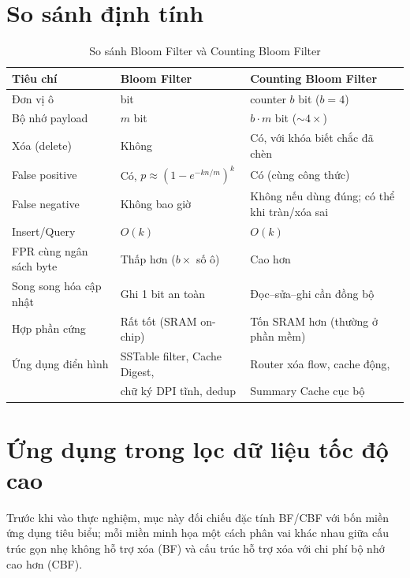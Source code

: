 \documentclass[11pt,a4paper]{article}
\begin{document}
\section{So sánh định tính}
\begin{table}[H]\centering
\caption{So sánh Bloom Filter và Counting Bloom Filter}
\label{tab:qualitative}
\small
\begin{tabular}{@{}
  >{\raggedright\arraybackslash}p{}
  >{\raggedright\arraybackslash}p{}
  >{\raggedright\arraybackslash}p{}@{}}
\toprule
Tiêu chí & Bloom Filter & Counting Bloom Filter \\
\midrule
Đơn vị ô          & 1 bit                  & counter $b$ bit ($b{=}4$) \\
Bộ nhớ payload    & $m$ bit                & $b\cdot m$ bit ($\sim4\times$) \\
Xóa (delete)      & Không                  & Có, với khóa biết chắc đã chèn \\
False positive    & Có, $p\approx(1-e^{-kn/m})^k$ & Có (cùng công thức) \\
False negative    & Không bao giờ          & Không nếu dùng đúng; có thể khi tràn/xóa sai \\
Insert/Query      & $O(k)$                 & $O(k)$ \\
FPR cùng ngân sách byte & Thấp hơn ($b\times$ số ô) & Cao hơn \\
Song song hóa cập nhật & Ghi 1 bit an toàn & Đọc--sửa--ghi cần đồng bộ \\
Hợp phần cứng     & Rất tốt (SRAM on-chip) & Tốn SRAM hơn (thường ở phần mềm) \\
Ứng dụng điển hình & SSTable filter, Cache Digest, & Router xóa flow, cache động, \\
                   & chữ ký DPI tĩnh, dedup & Summary Cache cục bộ \\
\bottomrule
\end{tabular}
\end{table}

\section{Ứng dụng trong lọc dữ liệu tốc độ cao}
\label{sec:applications}
Trước khi vào thực nghiệm, mục này đối chiếu đặc tính BF/CBF với bốn miền
ứng dụng tiêu biểu; mỗi miền minh họa một cách phân vai khác nhau giữa cấu
trúc gọn nhẹ không hỗ trợ xóa (BF) và cấu trúc hỗ trợ xóa với chi phí bộ
nhớ cao hơn (CBF).
\end{document}
